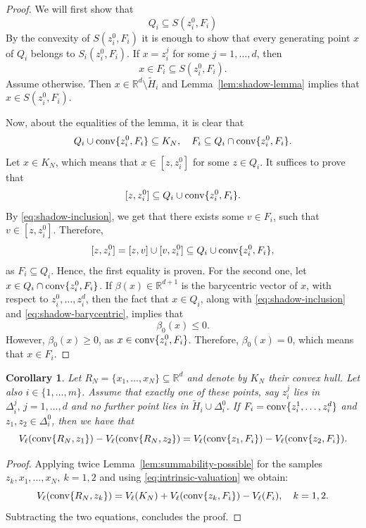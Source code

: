 \documentclass[10pt]{amsart}
\newcommand{\1}{\textbf{1}}
\newcommand{\conv}{{\rm conv}}
\numberwithin{equation}{section} %
\newtheorem{corollary}[theorem]{Corollary}
\theoremstyle{remark}
\theoremstyle{definition}
\begin{document}
\begin{proof}
We will first show that \begin{equation}\label{eq:shadow-inclusion}  
Q_i \subseteq S(z_i^0,F_i)
\end{equation}
By the convexity of $S(z_i^0,F_i)$ it is enough to show that every generating point $x$ of $Q_i$ belongs to $S_i(z_i^0,F_i)$. If $x=z_i^j$ for some $j=1,\ldots,d$, then \[x \in F_i \subseteq S(z_i^0,F_i).\] Assume otherwise. Then $x \in \mathbb{R}^d \setminus \widetilde{H}_i$ and Lemma~\ref{lem:shadow-lemma} implies that $x \in S(z_i^0,F_i)$.

 Now, about the equalities of the lemma, it is clear that \[Q_i \cup \conv\{z_i^0,F_i\}\subseteq K_N,\quad F_i \subseteq Q_i \cap \conv\{z_i^0,F_i\}.\]  Let  $x \in K_N$, which means that $x \in [z,z_i^0]$ for some $ z \in Q_i$. It suffices to prove that \[[z,z_i^0] \subseteq Q_i \cup \conv\{z_i^0,F_i\}.\] By \eqref{eq:shadow-inclusion}, we get that there exists some $v \in F_i$, 
 such that $v \in [z,z_i^0]$. Therefore, \[[z,z_i^0]=[z,v]\cup [v,z_i^0] \subseteq Q_i \cup \conv\{z_i^0,F_i\},\] as $F_i \subseteq Q_i$. Hence, the first equality is proven. For the second one, let $x \in Q_i \cap \conv\{z_i^0,F_i\}$. If $\beta(x) \in \mathbb{R}^{d+1}$ is the barycentric vector of $x$, with respect to  $z_i^0,\ldots,z_i^d$, then the fact that $x \in Q_i$, along with \eqref{eq:shadow-inclusion} and \eqref{eq:shadow-barycentric}, implies that \[\beta_0(x) \leq 0.\] However, $\beta_0(x) \geq 0$, as $x \in\conv\{z_i^0,F_i\}$. Therefore, $\beta_0(x)=0$, which means that $x \in F_i$. 
 \end{proof}

\begin{corollary}\label{cor:intrinsic-induction}
Let $R_N=\{x_1,\ldots,x_N\} \subseteq \mathbb{R}^d$ and denote by $K_N$ their convex hull. Let also $i \in \{1,\ldots,m\}$. Assume that exactly one of these points, say $z_i^j$ lies in $\Delta_i^j, \, j=1,\ldots,d$ and no further point lies in $\widetilde{H}_i \cup \Delta_i^0$. If $F_i=\conv\{z_i^1,\ldots,z_i^d\}$ and $z_1,z_2 \in \Delta_i^0$, then we have that
\[V_\ell(\conv\{R_N,z_1\})-V_\ell(\conv\{R_N,z_2\})=V_\ell(\conv\{z_1,F_i\})-V_\ell(\conv\{z_2,F_i\}).\]
\end{corollary}

\begin{proof}
    Applying twice Lemma~\ref{lem:summability-possible} for the samples $z_k, x_1,\ldots,x_N, \ k=1,2$ and using \eqref{eq:intrinsic-valuation} we obtain:
    \[V_\ell(\conv\{R_N,z_k\})= V_\ell(K_N)+V_\ell(\conv\{z_k,F_i\})-V_\ell(F_i), \quad k=1,2.
    \] Subtracting the two equations, concludes the proof.
\end{proof}
\end{document}
